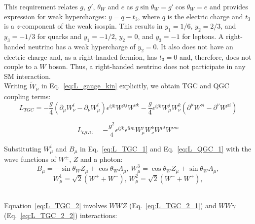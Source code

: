 This requirement relates $g$, $g'$, $\theta_W$ and $e$ as $g \sin \theta_W = g' \cos \theta_W = e$ and provides expression for weak hypercharges: $y = q - t_3$, where $q$ is the electric charge and $t_3$ is a $z$-component of the weak isospin. This results in $y_1=1/6$, $y_2=2/3$, and $y_3=-1/3$ for quarks and $y_1=-1/2$, $y_2=0$, and $y_3=-1$ for leptons. A right-handed neutrino has a weak hypercharge of $y_2=0$. It also does not have an electric charge and, as a right-handed fermion, has $t_3=0$ and, therefore, does not couple to a $W$ boson. Thus, a right-handed neutrino does not participate in any SM interaction.\\

Writing $\tilde{W}_\mu$ in Eq.~\ref{eq:L_gauge_kin} explicitly, we obtain TGC and QGC coupling terms:\\ 

\begin{equation} \label{eq:L_TGC_1}
L_{TGC} = -\frac{g}{4}(\partial_\mu W_\nu^i - \partial_\nu W_\mu^i)\epsilon^{ijk}W^{\mu j}W^{\nu k} - \frac{g}{4}\epsilon^{ijk}W_\mu^j W_\nu^k (\partial^\mu W^{\nu i} - \partial^\nu W^{\mu i})
\end{equation}

\begin{equation} \label{eq:L_QGC_1}
L_{QGC} = -\frac{g^2}{4} \epsilon^{ijk} \epsilon^{ilm} W_\mu^j W_\nu^k W^{\mu l} W^{\nu m}
\end{equation}

Substituting $W_\mu^i$ and $B_\mu$ in Eq.~\ref{eq:L_TGC_1} and Eq.~\ref{eq:L_QGC_1} with the wave functions of $W^\pm$, $Z$ and a photon:\\

\begin{equation} \label{eq:EWK_Zg_bosons_mixing}
B_\mu = -\sin \theta_W Z_\mu + \cos \theta_W A_\mu \text{, } W_\mu^3 = \cos \theta_W Z_\mu + \sin \theta_W A_\mu,
\end{equation}
\begin{equation} \label{eq:EWK_Zg_bosons_mixing}
W_\mu^1 = \sqrt{2}(W^+ + W^-) \text{, }W_\mu^2 = \sqrt{2}(W^- + W^+),
\end{equation}

\\

Equation~\ref{eq:L_TGC_2} involves $WWZ$ (Eq.~\ref{eq:L_TGC_2_1}) and $WW\gamma$ (Eq.~\ref{eq:L_TGC_2_2}) interactions:\\

